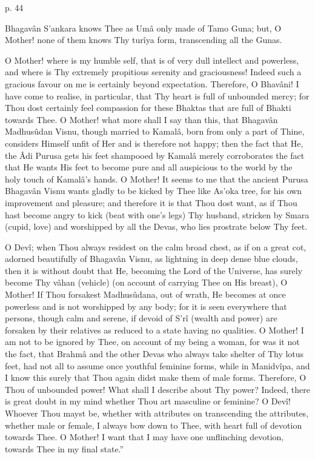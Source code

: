  

p. 44

 

Bhagavân S’ankara knows Thee as Umâ only made of Tamo Guna; but, O Mother! none of them knows Thy turîya form, transcending all the Gunas.

 

O Mother! where is my humble self, that is of very dull intellect and powerless, and where is Thy extremely propitious serenity and graciousness! Indeed such a gracious favour on me is certainly beyond expectation. Therefore, O Bhavâni! I have come to realise, in particular, that Thy heart is full of unbounded mercy; for Thou dost certainly feel compassion for these Bhaktas that are full of Bhakti towards Thee. O Mother! what more shall I say than this, that Bhagavân Madhusûdan Visnu, though married to Kamalâ, born from only a part of Thine, considers Himself unfit of Her and is therefore not happy; then the fact that He, the Âdi Purusa gets his feet shampooed by Kamalâ merely corroborates the fact that He wants His feet to become pure and all auspicious to the world by the holy touch of Kamalâ's hands. O Mother! It seems to me that the ancient Purusa Bhagavân Visnu wants gladly to be kicked by Thee like As'oka tree, for his own improvement and pleasure; and therefore it is that Thou dost want, as if Thou hast become angry to kick (beat with one's legs) Thy husband, stricken by Smara (cupid, love) and worshipped by all the Devas, who lies prostrate below Thy feet.

 

O Devî; when Thou always residest on the calm broad chest, as if on a great cot, adorned beautifully of Bhagavân Visnu, as lightning in deep dense blue clouds, then it is without doubt that He, becoming the Lord of the Universe, has surely become Thy vâhan (vehicle) (on account of carrying Thee on His breast), O Mother! If Thou forsakest Madhusûdana, out of wrath, He becomes at once powerless and is not worshipped by any body; for it is seen everywhere that persons, though calm and serene, if devoid of S’rî (wealth and power) are forsaken by their relatives as reduced to a state having no qualities. O Mother! I am not to be ignored by Thee, on account of my being a woman, for was it not the fact, that Brahmâ and the other Devas who always take shelter of Thy lotus feet, had not all to assume once youthful feminine forms, while in Manidvîpa, and I know this surely that Thou again didst make them of male forms. Therefore, O Thou of unbounded power! What shall I describe about Thy power? Indeed, there is great doubt in my mind whether Thou art masculine or feminine? O Devî! Whoever Thou mayst be, whether with attributes on transcending the attributes, whether male or female, I always bow down to Thee, with heart full of devotion towards Thee. O Mother! I want that I may have one unflinching devotion, towards Thee in my final state.”

